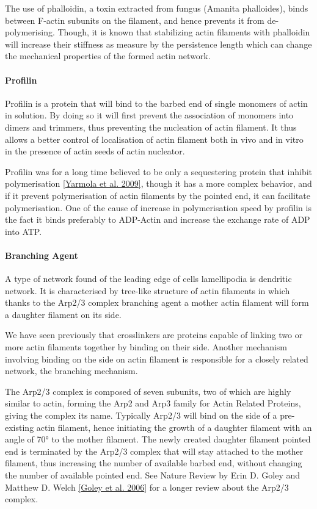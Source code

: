 \documentclass[A4paperpaper,11pt,english]{sphinxmanual}
\begin{document}
The use of phalloidin, a toxin extracted from fungus (Amanita phalloides), binds
between F-actin subunits on the filament, and hence  prevents it from
de-polymerising.  Though, it is known that stabilizing actin filaments with
phalloidin will increase their stiffness as measure by the persistence length which can change the
mechanical properties of the formed actin network.


\paragraph{Profilin}
\label{index-latex:profilin}
Profilin is a protein that will bind to the barbed end of single monomers of
actin in solution.  By doing so it will first prevent the association of
monomers into dimers and trimmers, thus preventing the nucleation of actin
filament. It thus allows a better control of localisation of actin filament
both in vivo and in vitro in the presence of actin seeds of actin nucleator.

Profilin was for a long time believed to be only a sequestering protein
that inhibit polymerisation {\hyperref[index-latex:yarmola2009]{{[}Yarmola et al. 2009{]}}}, though it has a more complex
behavior, and if it prevent polymerisation of actin filaments by the pointed
end, it can facilitate polymerisation. One of the cause of increase in
polymerisation speed by profilin is the fact it binds preferably to ADP-Actin
and increase the exchange rate of ADP into ATP.


\paragraph{Branching Agent}
\label{index-latex:branching-agent}
A type of network found of the leading edge of cells lamellipodia is dendritic
network. It is characterised by tree-like structure of actin filaments in which
thanks to the Arp2/3 complex branching agent a mother actin filament will form a
daughter filament on its side.

We have seen previously that crosslinkers are proteins capable of linking two
or more actin filaments together by binding on their side. Another mechanism
involving binding on the side on actin filament is responsible for a closely
related network, the branching mechanism.

The Arp2/3 complex is composed of seven subunits, two of which are highly
similar to actin, forming the Arp2 and Arp3 family for Actin Related Proteins,
giving the complex its name. Typically Arp2/3 will bind on the side of a pre-existing
actin filament, hence initiating the growth of a daughter filament with an angle of
70° to the mother filament. The newly created daughter filament pointed end
is terminated by the Arp2/3 complex that will stay attached to the mother
filament, thus increasing the number of available barbed end, without changing
the number of available pointed end. See Nature Review by Erin D. Goley and
Matthew D. Welch {\hyperref[index-latex:goley2006]{{[}Goley et al. 2006{]}}} for  a longer review about the Arp2/3
complex.
\end{document}
